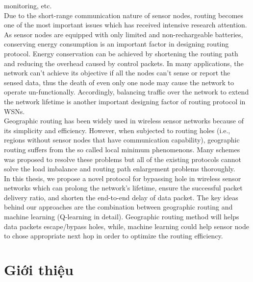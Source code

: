 \documentclass[12pt]{report}
\begin{document}
monitoring, etc.\\
Due to the short-range communication nature of sensor nodes, routing becomes one of the most important issues which has received intensive research attention. As sensor nodes are equipped with only limited and non-rechargeable batteries, conserving energy consumption is an important factor in designing routing protocol. Energy
conservation can be achieved by shortening the routing path and reducing the overhead
caused by control packets. In many applications, the network can’t achieve its objective
if all the nodes can’t sense or report the sensed data, thus the death of even only one
node may cause the network to operate un-functionally. Accordingly, balancing traffic
over the network to extend the network lifetime is another important designing factor of
routing protocol in WSNs.\\
Geographic routing has been widely used in wireless sensor networks because of its
simplicity and efficiency. However, when subjected to routing holes (i.e., regions without sensor nodes that have communication capability), geographic routing suffers from the so called local minimum phenomenons. Many schemes was proposed to resolve these problems but all of the existing protocols cannot solve the load imbalance and routing path enlargement problems thoroughly.\\
In this thesis, we propose a novel protocol for bypassing hole in wireless sensor networks which can prolong the network's lifetime, ensure the successful packet delivery ratio, and shorten the end-to-end delay of data packet. The key ideas behind our approaches are the combination between geographic routing and machine learning (Q-learning in detail). Geographic routing method will helps data packets escape/bypass holes, while, machine learning could help sensor node to chose appropriate next hop in order to optimize the routing efficiency.
\pagestyle{fancy}
\fancyhf{}
\fancyfoot[R]{\thepage}
\renewcommand{\footrulewidth}{0.5pt}

\tableofcontents
\listoffigures
\begingroup
\let\clearpage\relax
\listoftables
\listofalgorithms
\endgroup

\chapter{Giới thiệu}
\label{sec:1}
\end{document}
